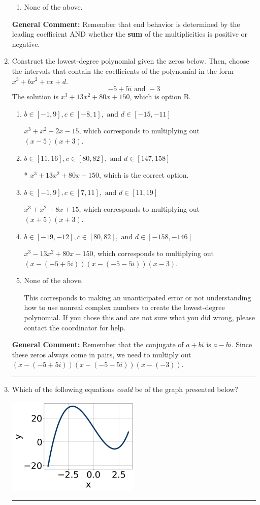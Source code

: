 \documentclass{extbook}[14pt]
\newcommand{\litem}[1]{\item #1

\rule{\textwidth}{0.4pt}}
\begin{document}
\begin{enumerate}
{\begin{enumerate}[label=\Alph*.]
\begin{multicols}{2}
\end{multicols}\item None of the above.\end{enumerate}
\textbf{General Comment:} Remember that end behavior is determined by the leading coefficient AND whether the \textbf{sum} of the multiplicities is positive or negative.
}
\litem{
Construct the lowest-degree polynomial given the zeros below. Then, choose the intervals that contain the coefficients of the polynomial in the form $x^3+bx^2+cx+d$.
\[ -5 + 5 i \text{ and } -3 \]The solution is \( x^{3} +13 x^{2} +80 x + 150 \), which is option B.\begin{enumerate}[label=\Alph*.]
\item \( b \in [-1, 9], c \in [-8, 1], \text{ and } d \in [-15, -11] \)

$x^{3} + x^{2} -2 x -15$, which corresponds to multiplying out $(x -5)(x + 3)$.
\item \( b \in [11, 16], c \in [80, 82], \text{ and } d \in [147, 158] \)

* $x^{3} +13 x^{2} +80 x + 150$, which is the correct option.
\item \( b \in [-1, 9], c \in [7, 11], \text{ and } d \in [11, 19] \)

$x^{3} + x^{2} +8 x + 15$, which corresponds to multiplying out $(x + 5)(x + 3)$.
\item \( b \in [-19, -12], c \in [80, 82], \text{ and } d \in [-158, -146] \)

$x^{3} -13 x^{2} +80 x -150$, which corresponds to multiplying out $(x-(-5 + 5 i))(x-(-5 - 5 i))(x -3)$.
\item \( \text{None of the above.} \)

This corresponds to making an unanticipated error or not understanding how to use nonreal complex numbers to create the lowest-degree polynomial. If you chose this and are not sure what you did wrong, please contact the coordinator for help.
\end{enumerate}

\textbf{General Comment:} Remember that the conjugate of $a+bi$ is $a-bi$. Since these zeros always come in pairs, we need to multiply out $(x-(-5 + 5 i))(x-(-5 - 5 i))(x-(-3))$.
}
\litem{
Which of the following equations \textit{could} be of the graph presented below?

\begin{center}
    \includegraphics[width=0.5\textwidth]{../Figures/polyGraphToFunctionCopyB.png}
\end{center}


}
\end{enumerate}
\end{document}
